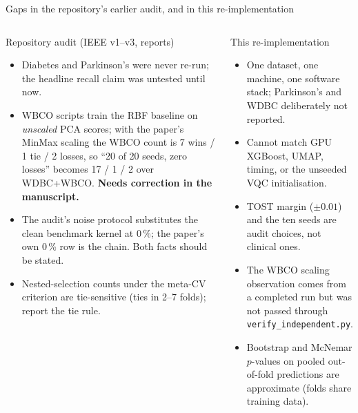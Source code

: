 \documentclass[aspectratio=169,10pt,t,xcolor={table}]{beamer}
\newcommand{\warn}[1]{\textcolor{qamber}{\textbf{#1}}}
\newcommand{\code}[1]{\texttt{\small #1}}
\begin{document}
\begin{frame}{Gaps in the repository's earlier audit, and in this re-implementation}
\begin{columns}[T]
\begin{block}{Repository audit (IEEE v1--v3, reports)}
\begin{itemize}\footnotesize
  \item Diabetes and Parkinson's were never re-run; the headline recall claim was untested until now.
  \item WBCO scripts train the RBF baseline on \emph{unscaled} PCA scores; with the paper's MinMax scaling the WBCO count is 7 wins / 1 tie / 2 losses, so ``20 of 20 seeds, zero losses'' becomes 17 / 1 / 2 over WDBC+WBCO. \warn{Needs correction in the manuscript.}
  \item The audit's noise protocol substitutes the clean benchmark kernel at 0\,\%; the paper's own 0\,\% row is the chain. Both facts should be stated.
  \item Nested-selection counts under the meta-CV criterion are tie-sensitive (ties in 2--7 folds); report the tie rule.
\end{itemize}
\end{block}
\begin{block}{This re-implementation}
\begin{itemize}\footnotesize
  \item One dataset, one machine, one software stack; Parkinson's and WDBC deliberately not reported.
  \item Cannot match GPU XGBoost, UMAP, timing, or the unseeded VQC initialisation.
  \item TOST margin ($\pm0.01$) and the ten seeds are audit choices, not clinical ones.
  \item The WBCO scaling observation comes from a completed run but was not passed through \code{verify\_independent.py}.
  \item Bootstrap and McNemar $p$-values on pooled out-of-fold predictions are approximate (folds share training data).
\end{itemize}
\end{block}
\end{columns}
\end{frame}
\end{document}
